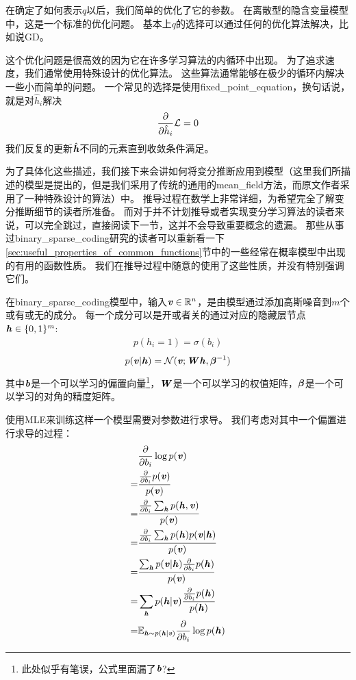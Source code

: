 在确定了如何表示$q$以后，我们简单的优化了它的参数。
在离散型的隐含变量模型中，这是一个标准的优化问题。
基本上$q$的选择可以通过任何的优化算法解决，比如说\gls{GD}。


这个优化问题是很高效的因为它在许多学习算法的内循环中出现。
为了追求速度，我们通常使用特殊设计的优化算法。
这些算法通常能够在极少的循环内解决一些小而简单的问题。
一个常见的选择是使用\gls{fixed_point_equation}，换句话说，就是对$\hat{h}_i$解决
\begin{align}
	\frac{\partial}{\partial \hat{h}_i}\mathcal{L} = 0
\end{align}
我们反复的更新$\hat{\boldsymbol{\mathit{h}}}$不同的元素直到收敛条件满足。


为了具体化这些描述，我们接下来会讲如何将变分推断应用到模型（这里我们所描述的模型是\citet{henniges2010binary}提出的，但是我们采用了传统的通用的\gls{mean_field}方法，而原文作者采用了一种特殊设计的算法）中。
推导过程在数学上非常详细，为希望完全了解变分推断细节的读者所准备。
而对于并不计划推导或者实现变分学习算法的读者来说，可以完全跳过，直接阅读下一节，这并不会导致重要概念的遗漏。
那些从事过\gls{binary_sparse_coding}研究的读者可以重新看一下\ref{sec:useful_properties_of_common_functions}节中的一些经常在概率模型中出现的有用的函数性质。
我们在推导过程中随意的使用了这些性质，并没有特别强调它们。


在\gls{binary_sparse_coding}模型中，输入$\boldsymbol{\mathit{v}}\in\mathbb{R}^n$，是由模型通过添加高斯噪音到$m$个或有或无的成分。
每一个成分可以是开或者关的通过对应的隐藏层节点$\boldsymbol{\mathit{h}} \in\{0,1\}^m$:
\begin{align}
	p(h_i = 1) = \sigma(b_i)
\end{align}
\begin{align}
	p(\boldsymbol{\mathit{v}}\vert\boldsymbol{\mathit{h}}) = \mathcal{N}(\boldsymbol{\mathit{v}};\boldsymbol{\mathit{W}} \boldsymbol{\mathit{h}},{\boldsymbol{\beta}}^{-1})
\end{align}
其中$\boldsymbol{\mathit{b}}$是一个可以学习的偏置向量\footnote{此处似乎有笔误，公式里面漏了$\boldsymbol{\mathit{b}}$?}，$\boldsymbol{\mathit{W}}$是一个可以学习的权值矩阵，${\boldsymbol{\beta}}$是一个可以学习的对角的精度矩阵。


使用\gls{MLE}来训练这样一个模型需要对参数进行求导。
我们考虑对其中一个偏置进行求导的过程：
\begin{align}
		& \frac{\partial}{\partial b_i} \log p(\boldsymbol{\mathit{v}}) \\
		= &  \frac{\frac{\partial}{\partial b_i} p(\boldsymbol{\mathit{v}})}{p(\boldsymbol{\mathit{v}})}\\
		= & \frac{\frac{\partial}{\partial b_i} \sum_{\boldsymbol{\mathit{h}}}^{} p(\boldsymbol{\mathit{h}},\boldsymbol{\mathit{v}})}{p(\boldsymbol{\mathit{v}})}\\
		= &  \frac{\frac{\partial}{\partial b_i} \sum_{\boldsymbol{\mathit{h}}}^{} p(\boldsymbol{\mathit{h}}) p(\boldsymbol{\mathit{v}}\vert \boldsymbol{\mathit{h}})  }{p(\boldsymbol{\mathit{v}})}\\
		= &  \frac{ \sum_{\boldsymbol{\mathit{h}}}^{}  p(\boldsymbol{\mathit{v}}\vert \boldsymbol{\mathit{h}}) \frac{\partial}{\partial b_i} p(\boldsymbol{\mathit{h}}) }{p(\boldsymbol{\mathit{v}})}\\
		= &  \sum_{\boldsymbol{\mathit{h}}}^{}  p(\boldsymbol{\mathit{h}}\vert \boldsymbol{\mathit{v}}) \frac{  \frac{\partial}{\partial b_i} p(\boldsymbol{\mathit{h}}) }{p(\boldsymbol{\mathit{h}})}\\
		= & \mathbb{E}_{\boldsymbol{\mathit{h}}\sim p(\boldsymbol{\mathit{h}}\vert\boldsymbol{\mathit{v}})} \frac{\partial}{\partial b_i}\log p(\boldsymbol{\mathit{h}})
\end{align}

